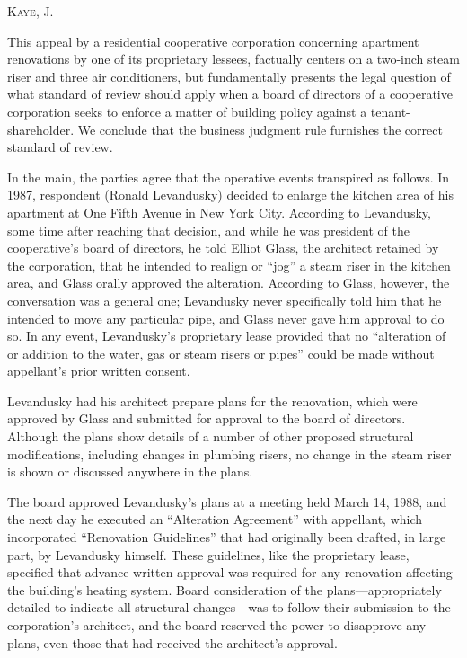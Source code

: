 

\opinion \textsc{Kaye}, J. 

This appeal by a residential cooperative corporation concerning apartment
renovations by one of its proprietary lessees, factually centers on a two-inch
steam riser and three air conditioners, but fundamentally presents the legal
question of what standard of review should apply when a board of directors of a
cooperative corporation seeks to enforce a matter of building policy against a
tenant-shareholder. We conclude that the business judgment rule furnishes the
correct standard of review. 

In the main, the parties agree that the operative events transpired as follows.
In 1987, respondent (Ronald Levandusky) decided to enlarge the kitchen area of
his apartment at One Fifth Avenue in New York City. According to Levandusky,
some time after reaching that decision, and while he was president of the
cooperative's board of directors, he told Elliot Glass, the architect retained
by the corporation, that he intended to realign or ``jog'' a steam riser in the
kitchen area, and Glass orally approved the alteration. According to Glass,
however, the conversation was a general one; Levandusky never specifically told
him that he intended to move any particular pipe, and Glass never gave him
approval to do so. In any event, Levandusky's proprietary lease provided that no
``alteration of or addition to the water, gas or steam risers or pipes'' could
be made without appellant's prior written consent. 

Levandusky had his architect prepare plans for the renovation, which were
approved by Glass and submitted for approval to the board of directors. Although
the plans show details of a number of other proposed structural modifications,
including changes in plumbing risers, no change in the steam riser is shown or
discussed anywhere in the plans. 

The board approved Levandusky's plans at a meeting held March 14, 1988, and the
next day he executed an ``Alteration Agreement'' with appellant, which
incorporated ``Renovation Guidelines'' that had originally been drafted, in
large part, by Levandusky himself. These guidelines, like the proprietary lease,
specified that advance written approval was required for any renovation
affecting the building's heating system. Board consideration of the
plans---appropriately detailed to indicate all structural changes---was to
follow their
submission to the corporation's architect, and the board reserved the power to
disapprove any plans, even those that had received the architect's approval. 

